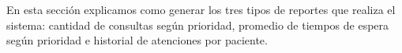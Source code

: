 En esta sección explicamos como generar los tres tipos de reportes que realiza el sistema: cantidad de consultas según prioridad, promedio de tiempos de espera según prioridad e historial de atenciones por paciente.



